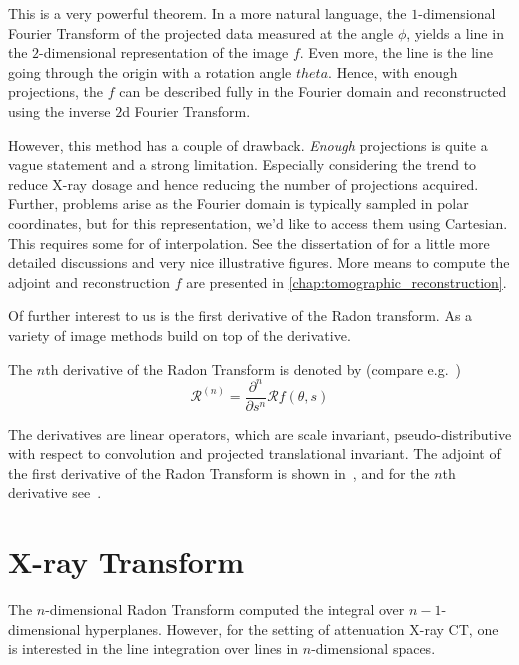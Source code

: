 This is a very powerful theorem. In a more natural language, the \(1\)-dimensional Fourier Transform
of the projected data measured at the angle \(\phi\), yields a line in the \(2\)-dimensional
representation of the image \(f\). Even more, the line is the line going through the origin with a
rotation angle \(theta\). Hence, with enough projections, the \(f\) can be described fully in the
Fourier domain and reconstructed using the inverse \(2\)d Fourier Transform.

However, this method has a couple of drawback. \textit{Enough} projections is quite a vague
statement and a strong limitation. Especially considering the trend to reduce X-ray dosage and hence
reducing the number of projections acquired. Further, problems arise as the Fourier domain is
typically sampled in polar coordinates, but for this representation, we'd like to access them using
Cartesian. This requires some for of interpolation. See the dissertation of
\citeauthor{vogel_tomographic_nodate}\cite[chap. 4.1.2]{vogel_tomographic_nodate} for a little more
detailed discussions and very nice illustrative figures. More means to compute the adjoint and
reconstruction \(f\) are presented in \autoref{chap:tomographic_reconstruction}.

Of further interest to us is the first derivative of the Radon transform. As a variety of image
methods build on top of the derivative.

\begin{definition}
	The \(n\)th derivative of the Radon Transform is denoted by (compare
	e.g.~\cite{nilchian_differential_2012,nilchian_fast_2013})
	\[ \mathscr{R}^{(n)} = \frac{\partial^n}{\partial s^n} \mathscr{R}f(\theta, s)\]
\end{definition}

The derivatives are linear operators, which are scale invariant, pseudo-distributive with respect to
convolution and projected translational invariant. The adjoint of the first derivative of the Radon
Transform is shown in~\cite{nilchian_differential_2012}, and for the \(n\)th derivative
see~\cite{nilchian_fast_2013}.

\section{X-ray Transform}\label{sec:xray_transform}

The \(n\)-dimensional Radon Transform computed the integral over \(n-1\)-dimensional hyperplanes.
However, for the setting of attenuation X-ray CT, one is interested in the line integration over
lines in \(n\)-dimensional spaces.

